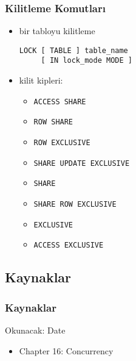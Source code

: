 \documentclass[dvipsnames]{beamer}
\theoremstyle{plain}
\begin{document}
\begin{frame}[fragile]
  \frametitle{Kilitleme Komutları}

    \begin{itemize}
      \item bir tabloyu kilitleme    
    \begin{lstlisting}
LOCK [ TABLE ] table_name
     [ IN lock_mode MODE ]
    \end{lstlisting}

      \item kilit kipleri:
      \begin{itemize}
        \item \lstinline!ACCESS SHARE!
        \item \lstinline!ROW SHARE!
        \item \lstinline!ROW EXCLUSIVE!
        \item \lstinline!SHARE UPDATE EXCLUSIVE!
        \item \lstinline!SHARE!
        \item \lstinline!SHARE ROW EXCLUSIVE!
        \item \lstinline!EXCLUSIVE!
        \item \lstinline!ACCESS EXCLUSIVE!
      \end{itemize}
    \end{itemize}
\end{frame}

\subsection*{Kaynaklar}

\begin{frame}
  \frametitle{Kaynaklar}

  \begin{block}{Okunacak: Date}
    \begin{itemize}
      \item Chapter 16: \alert{Concurrency}
    \end{itemize}
  \end{block}
\end{frame}
\end{document}
